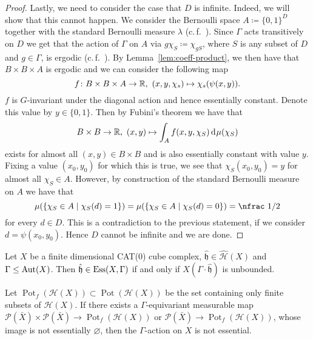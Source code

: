 \begin{proof}
  Lastly, we need to consider the case that \(D\) is infinite. Indeed, we will show that this cannot happen. We consider the Bernoulli space \(A \coloneqq \{0,1\}^D\) together with the standard Bernoulli measure \(\lambda\) (c.\,f.~\cite[29]{Klenke}). Since \(\Gamma\) acts transitively on \(D\) we get that the action of \(\Gamma\) on \(A\) via \(g\chi_S \coloneqq \chi_{gS}\), where \(S\) is any subset of \(D\) and \(g \in \Gamma\), is ergodic (c.\,f.~\cite[Example~20.26]{Klenke}).
  By Lemma~\ref{lem:coeff-product}, we then have that \(B \times B \times A\) is ergodic and we can consider the following map
  \[
    f\colon B \times B \times A \to \mathbb{R},\ (x,y,\chi_s) \mapsto \chi_s(\psi(x,y)).
  \]
  \(f\) is \(G\)-invariant under the diagonal action and hence essentially constant. Denote this value by \(y \in \{0,1\}\). Then by Fubini's theorem we have that
  \[
    B \times B \to \R,\ (x,y) \mapsto \int_A f(x,y,\chi_S) \d\mu(\chi_S)
  \]
  exists for almost all \((x,y) \in B \times B\) and is also essentially constant with value \(y\). Fixing a value \((x_0, y_0)\) for which this is true, we see that \(\chi_S(x_0,y_0) = y\) for almost all \(\chi_S \in A\). However, by construction of the standard Bernoulli measure on \(A\) we have that
  \[
    \mu(\{\chi_S \in A \mid \chi_S(d) = 1 \}) = \mu(\{\chi_S \in A \mid \chi_S(d) = 0\}) = \text{\nfrac 1/2}
  \]
  for every \(d \in D\). This is a contradiction to the previous statement, if we consider \(d = \psi(x_0, y_0)\). Hence \(D\) cannot be infinite and we are done.
\end{proof}

\begin{lemma}
  \label{lem:ess-unbounded}
  Let \(X\) be a finite dimensional CAT(0) cube complex, \(\mathfrak{\hat h} \in \mathcal{\hat H}(X)\) and \(\Gamma \leq \operatorname{Aut}(X)\). Then \(\mathfrak{\hat h} \in \operatorname{Ess}(X,\Gamma)\) if and only if \(X(\Gamma \cdot \mathfrak{\hat h})\) is unbounded.
\end{lemma}

\begin{cor}[{\cite[Cor. 4.5]{MR3509968}}]
  \label{cor:4.5}
  Let \(\operatorname{Pot}_f(\mathcal{H}(X)) \subset \operatorname{Pot}(\mathcal{H}(X))\) be the set containing only finite subsets of \(\mathcal{H}(X)\). If there exists a \(\Gamma\)-equivariant measurable map \(\mathcal{P}(\bar X) \times \mathcal{P}(\bar X) \to \operatorname{Pot}_f(\mathcal{H}(X))\) or \(\mathcal{P}(\bar X) \to \operatorname{Pot}_f(\mathcal{H}(X))\), whose image is not essentially \(\varnothing\), then the \(\Gamma\)-action on \(X\) is not essential.
\end{cor}

